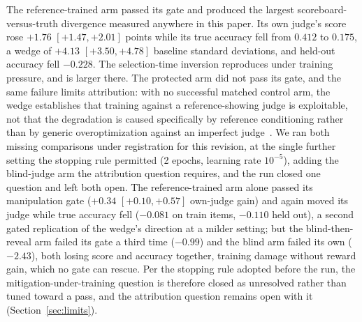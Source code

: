 \documentclass[11pt]{article}
\begin{document}
The reference-trained arm passed its gate and produced the largest scoreboard-versus-truth divergence measured anywhere in this paper.
Its own judge's score rose $+1.76$ $[+1.47, +2.01]$ points while its true accuracy fell from $0.412$ to $0.175$, a wedge of $+4.13$ $[+3.50, +4.78]$ baseline standard deviations, and held-out accuracy fell $-0.228$.
The selection-time inversion reproduces under training pressure, and is larger there.
The protected arm did not pass its gate, and the same failure limits attribution: with no successful matched control arm, the wedge establishes that training against a reference-showing judge is exploitable, not that the degradation is caused specifically by reference conditioning rather than by generic overoptimization against an imperfect judge~\cite{gao2022scaling}.
We ran both missing comparisons under registration for this revision, at the single further setting the stopping rule permitted (2 epochs, learning rate $10^{-5}$), adding the blind-judge arm the attribution question requires, and the run closed one question and left both open.
The reference-trained arm alone passed its manipulation gate ($+0.34$ $[+0.10, +0.57]$ own-judge gain) and again moved its judge while true accuracy fell ($-0.081$ on train items, $-0.110$ held out), a second gated replication of the wedge's direction at a milder setting; but the blind-then-reveal arm failed its gate a third time ($-0.99$) and the blind arm failed its own ($-2.43$), both losing score and accuracy together, training damage without reward gain, which no gate can rescue.
Per the stopping rule adopted before the run, the mitigation-under-training question is therefore closed as unresolved rather than tuned toward a pass, and the attribution question remains open with it (Section~\ref{sec:limits}).
\end{document}
